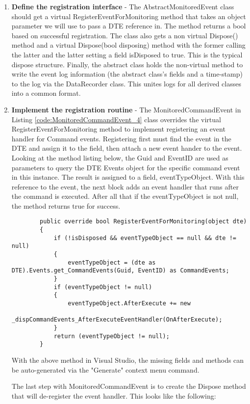 \begin{enumerate}
\item {\bf Define the registration interface } - 
The AbstractMonitoredEvent class should get a virtual RegisterEventForMonitoring method that takes an object parameter we will use to pass a DTE reference in.  The method returns a bool based on successful registration.  The class also gets a non virtual Dispose() method  and a virtual Dispose(bool disposing) method with the former calling the latter and the latter setting a field isDisposed to true. This is the typical dispose structure.  Finally, the abstract class holds the non-virtual method to write the event log information (the abstract class's fields and a time-stamp) to the log via the DataRecorder class.  This unites logs for all derived classes into a common format.

\item {\bf Implement the registration routine} - 
The MonitoredCommandEvent in Listing \ref{code:MonitoredCommandEvent_4} class overrides the virtual RegisterEventForMonitoring method to implement registering an event handler for Command events.  Registering first must find the event in the DTE and assign it to the field, then attach a new event hander to the event.  Looking at the method listing below, the Guid and EventID are used as parameters to query the DTE Events object for the specific command event in this instance.  The result is assigned to a field, eventTypeObject.  With this reference to the event, the next block adds an event handler that runs after the command is executed.  After all that if the eventTypeObject is not null, the method returns true for success.
\begin{lstlisting}
        public override bool RegisterEventForMonitoring(object dte)
        {
            if (!isDisposed && eventTypeObject == null && dte != null)
            {
                eventTypeObject = (dte as DTE).Events.get_CommandEvents(Guid, EventID) as CommandEvents;
            }
            if (eventTypeObject != null)
            {
                eventTypeObject.AfterExecute += new 
			_dispCommandEvents_AfterExecuteEventHandler(OnAfterExecute);
            }
            return (eventTypeObject != null);
        }
\end{lstlisting}

With the above method in Visual Studio, the missing fields and methods can be auto-generated via the "Generate" context menu command.  

The last step with MonitoredCommandEvent is to create the Dispose method that will de-register the event handler. This looks like the following:


\end{enumerate}
